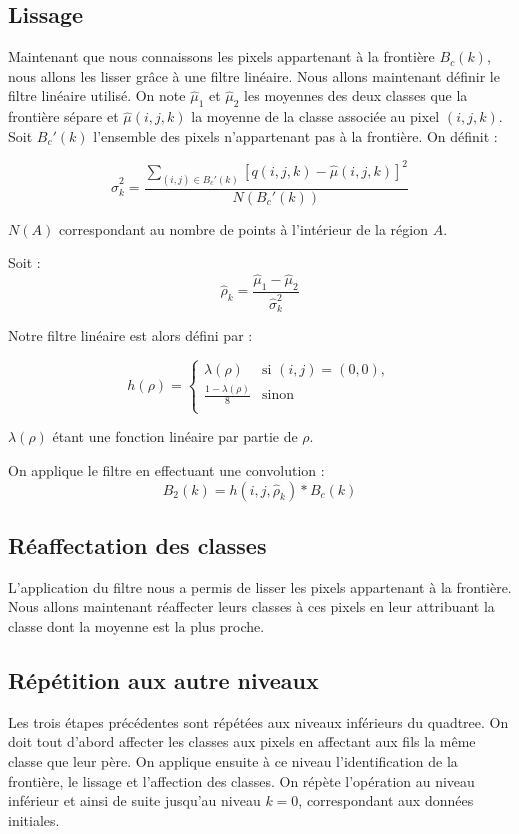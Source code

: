 \subsection{Lissage}
	Maintenant que nous connaissons les pixels appartenant à la frontière $B_c(k)$, nous allons les lisser grâce à une filtre linéaire. Nous allons maintenant définir le filtre linéaire utilisé.
	On note $\hat{\mu}_1$ et $\hat{\mu}_2$ les moyennes des deux classes que la frontière sépare et $\hat{\mu}(i,j,k)$ la moyenne de la classe associée au pixel $(i,j,k)$.\\

	Soit $B_c'(k)$ l'ensemble des pixels n'appartenant pas à la frontière. On définit :

	\[ \hat{\sigma}_k^2 = \frac{\sum\limits_{(i,j) \in B_c'(k)}[q(i,j,k)-\hat{\mu}(i,j,k)]^2}{N(B_c'(k))} \]

	$N(A)$ correspondant au nombre de points à l'intérieur de la région $A$.

	Soit :
	\[ \hat{\rho}_k = \frac{\hat{\mu}_1 - \hat{\mu}_2}{\hat{\sigma}_k^2} \]

	Notre filtre linéaire est alors défini par :

	\[ h(\rho) = \left\lbrace\begin{array}{cc}
		\lambda(\rho) & \mbox{si } (i,j) = (0,0), \\
		\frac{1 - \lambda(\rho)}{8} & \mbox{sinon}\\
	\end{array}\right.
	\]

	$\lambda(\rho)$ étant une fonction linéaire par partie de $\rho$.

	On applique le filtre en effectuant une convolution :
	\[ B_2(k) = h(i,j,\hat{\rho}_k) * B_c(k) \]

\subsection{Réaffectation des classes}
	L'application du filtre nous a permis de lisser les pixels appartenant à la frontière. Nous allons maintenant réaffecter leurs classes à ces pixels en leur attribuant la classe dont la moyenne est la plus proche.

\subsection{Répétition aux autre niveaux}
	Les trois étapes précédentes sont répétées aux niveaux inférieurs du quadtree. On doit tout d'abord affecter les classes aux pixels en affectant aux fils la même classe que leur père. On applique ensuite à ce niveau l'identification de la frontière, le lissage et l'affection des classes. On répète l'opération au niveau inférieur et ainsi de suite jusqu'au niveau $k=0$, correspondant aux données initiales.